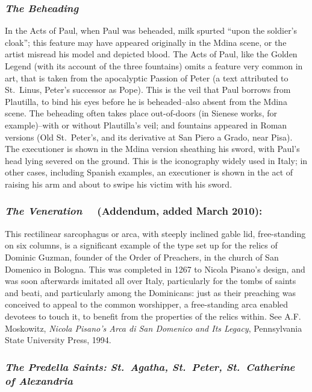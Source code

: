 \documentclass[a4paper,12pt]{article}
\begin{document}
\subsubsection*{\textit{The Beheading}}

In the Acts of Paul, when Paul was beheaded, milk spurted ``upon the
soldier's cloak''; this feature may have appeared originally in the
Mdina scene, or the artist misread his model and depicted blood. The
Acts of Paul, like the Golden Legend (with its account of the three
fountains) omits a feature very common in art, that is taken from the
apocalyptic Passion of Peter (a text attributed to St.~Linus, Peter's
successor as Pope).  This is the veil that Paul borrows from
Plautilla, to bind his eyes before he is beheaded--also absent from
the Mdina scene. The beheading often takes place out-of-doors (in
Sienese works, for example)--with or without Plautilla's veil; and
fountains appeared in Roman versions (Old St.~Peter's, and its
derivative at San Piero a Grado, near Pisa). The executioner is shown
in the Mdina version sheathing his sword, with Paul's head lying
severed on the ground. This is the iconography widely used in Italy;
in other cases, including Spanish examples, an executioner is shown in
the act of raising his arm and about to swipe his victim with his
sword.

\subsubsection*{\textit{The Veneration}\rm
\ \ (Addendum, added March 2010):}

%
This rectilinear sarcophagus or arca, with steeply inclined gable lid,
free-standing on six columns, is a significant example of the type set
up for the relics of Dominic Guzman, founder of the Order of
Preachers, in the church of San Domenico in Bologna.  This was
completed in 1267 to Nicola Pisano's design, and was soon afterwards
imitated all over Italy, particularly for the tombs of saints and
beati, and particularly among the Dominicans: just as their preaching
was conceived to appeal to the common worshipper, a free-standing arca
enabled devotees to touch it, to benefit from the properties of the
relics within.  See A.F. Moskowitz, \textit{Nicola Pisano's Arca di
  San Domenico and Its Legacy}, Pennsylvania State University Press,
1994.
%

\subsubsection*{\textit{ The Predella Saints: St.~Agatha, St.~Peter,
  St.~Catherine of Alexandria}}
\end{document}
